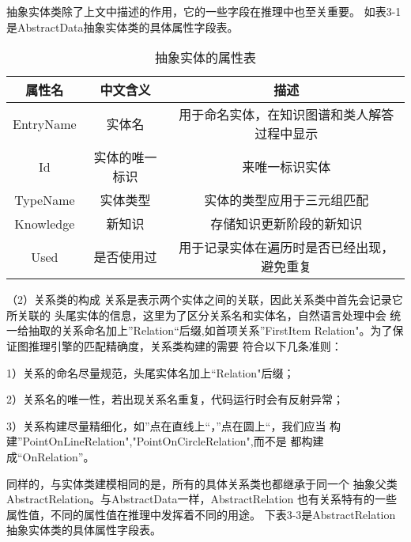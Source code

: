 \documentclass{standalone}
\begin{document}
抽象实体类除了上文中描述的作用，它的一些字段在推理中也至关重要。
如表3-1是AbstractData抽象实体类的具体属性字段表。
\begin{table}[h]
	\caption{抽象实体的属性表} 
	\begin{tabular}{|c|c|c|} 
		\hline  
		属性名 & 中文含义 & 描述 \\
		\hline 
		EntryName & 实体名 & 用于命名实体，在知识图谱和类人解答过程中显示\\  
		\hline  
		Id & 实体的唯一标识 & 来唯一标识实体 \\  
		\hline  
		TypeName & 实体类型 & 实体的类型应用于三元组匹配 \\  
		\hline 
		Knowledge & 新知识 & 存储知识更新阶段的新知识 \\  
		\hline 
		Used & 是否使用过 & 用于记录实体在遍历时是否已经出现，避免重复 \\  
		\hline  
	\end{tabular}
	\label{tablea}
\end{table}

（2）关系类的构成
关系是表示两个实体之间的关联，因此关系类中首先会记录它所关联的
头尾实体的信息，这里为了区分关系名和实体名，自然语言处理中会
统一给抽取的关系命名加上”Relation“后缀,如首项关系”FirstItem
Relation"。为了保证图推理引擎的匹配精确度，关系类构建的需要
符合以下几条准则：

1）关系的命名尽量规范，头尾实体名加上“Relation"后缀；

2）关系名的唯一性，若出现关系名重复，代码运行时会有反射异常；

3）关系构建尽量精细化，如”点在直线上“，”点在圆上“，我们应当
构建”PointOnLineRelation","PointOnCircleRelation",而不是
都构建成“OnRelation”。

同样的，与实体类建模相同的是，所有的具体关系类也都继承于同一个
抽象父类AbstractRelation。与AbstractData一样，AbstractRelation
也有关系特有的一些属性值，不同的属性值在推理中发挥着不同的用途。
下表3-3是AbstractRelation抽象实体类的具体属性字段表。
\end{document}
